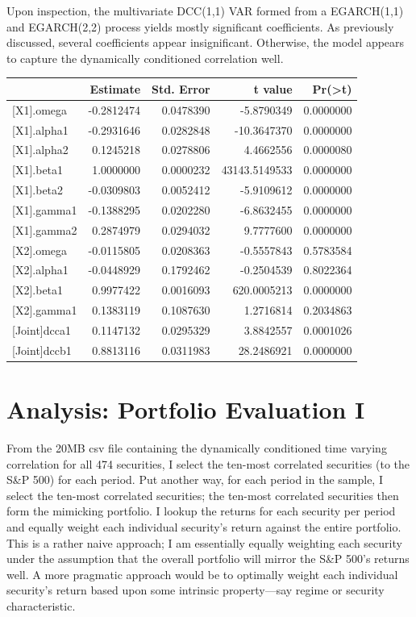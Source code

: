 \documentclass[]{elsarticle} %
\begin{document}
Upon inspection, the multivariate DCC(1,1) VAR formed from a EGARCH(1,1)
and EGARCH(2,2) process yields mostly significant coefficients. As
previously discussed, several coefficients appear insignificant.
Otherwise, the model appears to capture the dynamically conditioned
correlation well.

\begin{longtable}[c]{@{}lrrrr@{}}
\toprule
& Estimate & Std. Error & t value &
Pr(\textgreater{}\textbar{}t\textbar{})\tabularnewline
\midrule
\endhead
{[}X1{]}.omega & -0.2812474 & 0.0478390 & -5.8790349 &
0.0000000\tabularnewline
{[}X1{]}.alpha1 & -0.2931646 & 0.0282848 & -10.3647370 &
0.0000000\tabularnewline
{[}X1{]}.alpha2 & 0.1245218 & 0.0278806 & 4.4662556 &
0.0000080\tabularnewline
{[}X1{]}.beta1 & 1.0000000 & 0.0000232 & 43143.5149533 &
0.0000000\tabularnewline
{[}X1{]}.beta2 & -0.0309803 & 0.0052412 & -5.9109612 &
0.0000000\tabularnewline
{[}X1{]}.gamma1 & -0.1388295 & 0.0202280 & -6.8632455 &
0.0000000\tabularnewline
{[}X1{]}.gamma2 & 0.2874979 & 0.0294032 & 9.7777600 &
0.0000000\tabularnewline
{[}X2{]}.omega & -0.0115805 & 0.0208363 & -0.5557843 &
0.5783584\tabularnewline
{[}X2{]}.alpha1 & -0.0448929 & 0.1792462 & -0.2504539 &
0.8022364\tabularnewline
{[}X2{]}.beta1 & 0.9977422 & 0.0016093 & 620.0005213 &
0.0000000\tabularnewline
{[}X2{]}.gamma1 & 0.1383119 & 0.1087630 & 1.2716814 &
0.2034863\tabularnewline
{[}Joint{]}dcca1 & 0.1147132 & 0.0295329 & 3.8842557 &
0.0001026\tabularnewline
{[}Joint{]}dccb1 & 0.8813116 & 0.0311983 & 28.2486921 &
0.0000000\tabularnewline
\bottomrule
\end{longtable}

\section{Analysis: Portfolio Evaluation
I}\label{analysis-portfolio-evaluation-i}

From the 20MB csv file containing the dynamically conditioned time
varying correlation for all 474 securities, I select the ten-most
correlated securities (to the S\&P 500) for each period. Put another
way, for each period in the sample, I select the ten-most correlated
securities; the ten-most correlated securities then form the mimicking
portfolio. I lookup the returns for each security per period and equally
weight each individual security's return against the entire portfolio.
This is a rather naive approach; I am essentially equally weighting each
security under the assumption that the overall portfolio will mirror the
S\&P 500's returns well. A more pragmatic approach would be to optimally
weight each individual security's return based upon some intrinsic
property---say regime or security characteristic.
\end{document}
